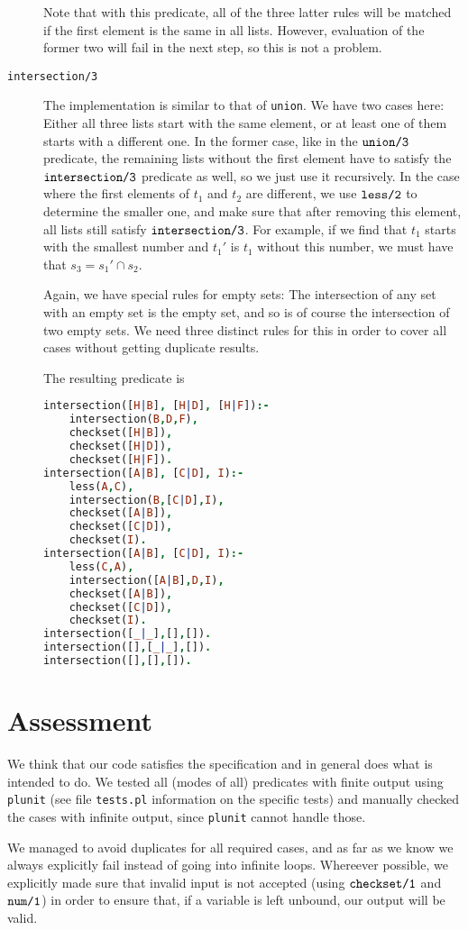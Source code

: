 \documentclass[a4paper]{article}
\newcommand{\pfuncn}[2]{\textnormal{\texttt{#1/#2}}\xspace}
\begin{document}
\begin{description}
Note that with this predicate, all of the three latter rules will be matched if the first element is the same in all lists. However, evaluation of the former two will fail in the next step, so this is not a problem.
\item[\pfuncn{intersection}{3}] The implementation is similar to that of \texttt{union}. We have two cases here: Either all three lists start with the same element, or at least one of them starts with a different one. In the former case, like in the $\pfuncn{union}{3}$ predicate, the remaining lists without the first element have to satisfy the $\pfuncn{intersection}{3}$ predicate as well, so we just use it recursively. In the case where the first elements of $t_1$ and $t_2$ are different, we use $\pfuncn{less}{2}$ to determine the smaller one, and make sure that after removing this element, all lists still satisfy $\pfuncn{intersection}{3}$. For example, if we find that $t_1$ starts with the smallest number and $t_1'$ is $t_1$ without this number, we must have that $s_3 = s_1' \cap s_2$. 

Again, we have special rules for empty sets: The intersection of any set with an empty set is the empty set, and so is of course the intersection of two empty sets. We need three distinct rules for this in order to cover all cases without getting duplicate results. 

The resulting predicate is 
\begin{lstlisting}[language=prolog]
intersection([H|B], [H|D], [H|F]):-
	intersection(B,D,F),
	checkset([H|B]),
	checkset([H|D]),
	checkset([H|F]).
intersection([A|B], [C|D], I):-
	less(A,C),
	intersection(B,[C|D],I),
	checkset([A|B]),
	checkset([C|D]),
	checkset(I).
intersection([A|B], [C|D], I):-
	less(C,A),
	intersection([A|B],D,I),
	checkset([A|B]),
	checkset([C|D]),
	checkset(I).
intersection([_|_],[],[]).
intersection([],[_|_],[]).
intersection([],[],[]).
\end{lstlisting}
\end{description}

\section*{Assessment}
We think that our code satisfies the specification and in general does what is intended to do. We tested all (modes of all) predicates with finite output using \texttt{plunit} (see file \texttt{tests.pl} information on the specific tests) and manually checked the cases with infinite output, since \texttt{plunit} cannot handle those. 

We managed to avoid duplicates for all required cases, and as far as we know we always explicitly fail instead of going into infinite loops. Whereever possible, we explicitly made sure that invalid input is not accepted (using $\pfuncn{checkset}{1}$ and $\pfuncn{num}{1}$) in order to ensure that, if a variable is left unbound, our output will be valid. 

\end{document}
